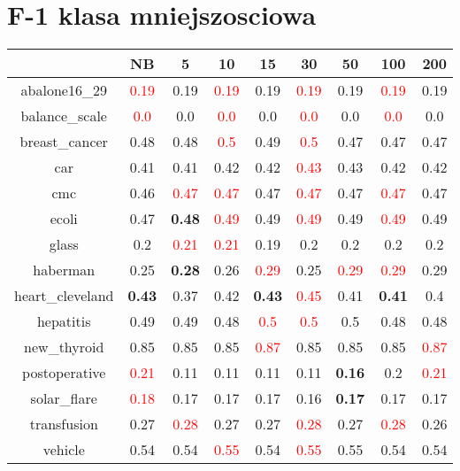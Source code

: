 \documentclass{article}%
\begin{document}
\section*{F{-}1 klasa mniejszosciowa}%
\begin{tabular}{c|cccccccc}%
\hline%
&NB&5&10&15&30&50&100&200\\%
\hline%
abalone16\_29&\textcolor{red}{ 
0.19
}&0.19&\textcolor{red}{ 
0.19
}&0.19&\textcolor{red}{ 
0.19
}&0.19&\textcolor{red}{ 
0.19
}&0.19\\%
\hline%
balance\_scale&\textcolor{red}{ 
0.0
}&0.0&\textcolor{red}{ 
0.0
}&0.0&\textcolor{red}{ 
0.0
}&0.0&\textcolor{red}{ 
0.0
}&0.0\\%
\hline%
breast\_cancer&0.48&0.48&\textcolor{red}{ 
0.5
}&0.49&\textcolor{red}{ 
0.5
}&0.47&0.47&0.47\\%
\hline%
car&0.41&0.41&0.42&0.42&\textcolor{red}{ 
0.43
}&0.43&0.42&0.42\\%
\hline%
cmc&0.46&\textcolor{red}{ 
0.47
}&\textcolor{red}{ 
0.47
}&0.47&\textcolor{red}{ 
0.47
}&0.47&\textcolor{red}{ 
0.47
}&0.47\\%
\hline%
ecoli&0.47&\textbf{0.48}&\textcolor{red}{ 
0.49
}&0.49&\textcolor{red}{ 
0.49
}&0.49&\textcolor{red}{ 
0.49
}&0.49\\%
\hline%
glass&0.2&\textcolor{red}{ 
0.21
}&\textcolor{red}{ 
0.21
}&0.19&0.2&0.2&0.2&0.2\\%
\hline%
haberman&0.25&\textbf{0.28}&0.26&\textcolor{red}{ 
0.29
}&0.25&\textcolor{red}{ 
0.29
}&\textcolor{red}{ 
0.29
}&0.29\\%
\hline%
heart\_cleveland&\textbf{0.43}&0.37&0.42&\textbf{0.43}&\textcolor{red}{ 
0.45
}&0.41&\textbf{0.41}&0.4\\%
\hline%
hepatitis&0.49&0.49&0.48&\textcolor{red}{ 
0.5
}&\textcolor{red}{ 
0.5
}&0.5&0.48&0.48\\%
\hline%
new\_thyroid&0.85&0.85&0.85&\textcolor{red}{ 
0.87
}&0.85&0.85&0.85&\textcolor{red}{ 
0.87
}\\%
\hline%
postoperative&\textcolor{red}{ 
0.21
}&0.11&0.11&0.11&0.11&\textbf{0.16}&0.2&\textcolor{red}{ 
0.21
}\\%
\hline%
solar\_flare&\textcolor{red}{ 
0.18
}&0.17&0.17&0.17&0.16&\textbf{0.17}&0.17&0.17\\%
\hline%
transfusion&0.27&\textcolor{red}{ 
0.28
}&0.27&0.27&\textcolor{red}{ 
0.28
}&0.27&\textcolor{red}{ 
0.28
}&0.26\\%
\hline%
vehicle&0.54&0.54&\textcolor{red}{ 
0.55
}&0.54&\textcolor{red}{ 
0.55
}&0.55&0.54&0.54\\%

\end{tabular}
\end{document}
